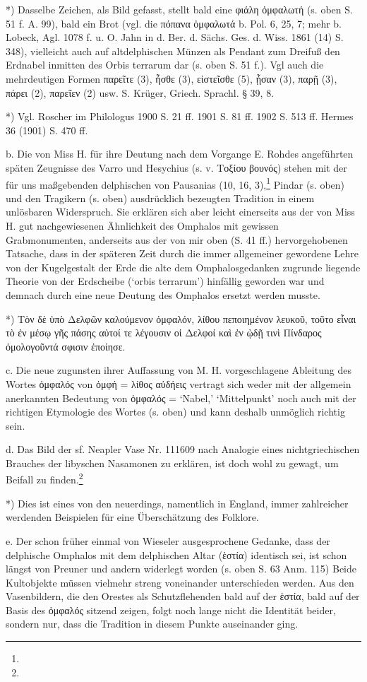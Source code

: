 \documentclass[a4paper, 11pt, oneside]{article}
\begin{document}
*) Dasselbe Zeichen, als Bild gefasst, stellt bald eine φιάλη ὀμφαλωτή (s. oben S. 51 f. A. 99), bald ein Brot (vgl. die πόπανα ὀμφαλωτά b. Pol. 6, 25, 7; mehr b. Lobeck, Agl. 1078 f. u. O. Jahn in d. Ber. d. Sächs. Ges. d. Wiss. 1861 (14) S. 348), vielleicht auch auf altdelphischen Münzen als Pendant zum Dreifuß den Erdnabel inmitten des Orbis terrarum dar (s. oben S. 51 f.). Vgl auch die mehrdeutigen Formen παρεῖτε (3), ἦσθε (3), εἰστεῖσθε (5), ᾖσαν (3), παρῇ (3), πάρει (2), παρεῖεν (2) usw. S. Krüger, Griech. Sprachl. § 39, 8.

*) Vgl. Roscher im Philologus 1900 S. 21 ff. 1901 S. 81 ff. 1902 S. 513 ff. Hermes 36 (1901) S. 470 ff.

b. Die von Miss H. für ihre Deutung nach dem Vorgange E. Rohdes angeführten späten Zeugnisse des Varro und Hesychius (s. v. Τοξίου βουνός) stehen mit der für uns maßgebenden delphischen von Pausanias (10, 16, 3),\footnote{} Pindar (s. oben) und den Tragikern (s. oben) ausdrücklich bezeugten Tradition in einem unlösbaren Widerspruch. Sie erklären sich aber leicht einerseits aus der von Miss H. gut nachgewiesenen Ähnlichkeit des Omphalos mit gewissen Grabmonumenten, anderseits aus der von mir oben (S. 41 ff.) hervorgehobenen Tatsache, dass in der späteren Zeit durch die immer allgemeiner gewordene Lehre von der Kugelgestalt der Erde die alte dem Omphalosgedanken zugrunde liegende Theorie von der Erdscheibe (`orbis terrarum') hinfällig geworden war und demnach durch eine neue Deutung des Omphalos ersetzt werden musste.

*) Τὸν δὲ ὑπὸ Δελφῶν καλούμενον ὀμφαλόν, λίθου πεποιημένον λευκοῦ, τοῦτο εἶναι τὸ ἐν μέσῳ γῆς πάσης αὐτοί τε λέγουσιν οἱ Δελφοί καὶ ἐν ᾠδῇ τινὶ Πίνδαρος ὁμολογοῦντά σφισιν ἐποίησε.

c. Die neue zugunsten ihrer Auffassung von M. H. vorgeschlagene Ableitung des Wortes ὀμφαλός von ὀμφή = λίθος αὐδήεις vertragt sich weder mit der allgemein anerkannten Bedeutung von ὀμφαλός = `Nabel,' `Mittelpunkt' noch auch mit der richtigen Etymologie des Wortes (s. oben) und kann deshalb unmöglich richtig sein.

d. Das Bild der sf. Neapler Vase Nr. 111609 nach Analogie eines nichtgriechischen Brauches der libyschen Nasamonen zu erklären, ist doch wohl zu gewagt, um Beifall zu finden.\footnote{}

*) Dies ist eines von den neuerdings, namentlich in England, immer zahlreicher werdenden Beispielen für eine Überschätzung des Folklore.

e. Der schon früher einmal von Wieseler ausgesprochene Gedanke, dass der delphische Omphalos mit dem delphischen Altar (ἑστία) identisch sei, ist schon längst von Preuner und andern widerlegt worden (s. oben S. 63 Anm. 115) Beide Kultobjekte müssen vielmehr streng voneinander unterschieden werden. Aus den Vasenbildern, die den Orestes als Schutzflehenden bald auf der ἑστία, bald auf der Basis des ὀμφαλός sitzend zeigen, folgt noch lange nicht die Identität beider, sondern nur, dass die Tradition in diesem Punkte auseinander ging.
\end{document}
